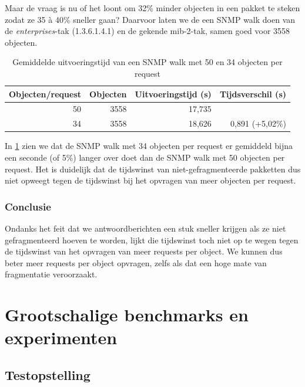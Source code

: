 Maar de vraag is nu of het loont om 32\% minder objecten in een pakket te steken zodat ze 35 à 40\% sneller gaan?
Daarvoor laten we de \nwmretriever{} een SNMP walk doen van de \textit{enterprises}-tak (1.3.6.1.4.1) en de gekende mib-2-tak, samen goed voor 3558 objecten.

\begin{table}[h]
\centering
\begin{tabular}{@{}rrrr@{}}
\toprule
Objecten/request & Objecten & Uitvoeringstijd (s) & Tijdsverschil (s) \\ \midrule
50               & 3558     & 17,735              &                   \\
34               & 3558     & 18,626              & 0,891 (+5,02\%)   \\ \bottomrule
\end{tabular}
\caption{Gemiddelde uitvoeringstijd van een SNMP walk met 50 en 34 objecten per request}
\label{tabel-fragmentatie-uitvoeringstijd}
\end{table}

In \cref{tabel-fragmentatie-uitvoeringstijd} zien we dat de SNMP walk met 34 objecten per request er gemiddeld bijna een seconde (of 5\%) langer over doet
dan de SNMP walk met 50 objecten per request.
Het is duidelijk dat de tijdswinst van niet-gefragmenteerde pakketten dus niet opweegt tegen de tijdswinst bij het opvragen van meer objecten per request.

\subsubsection{Conclusie}

Ondanks het feit dat we antwoordberichten een stuk sneller krijgen als ze niet gefragmenteerd hoeven te worden,
lijkt die tijdswinst toch niet op te wegen tegen de tijdswinst van het opvragen van meer requests per object.
We kunnen dus beter meer requests per object opvragen, zelfs als dat een hoge mate van fragmentatie veroorzaakt.


\section{Grootschalige benchmarks en experimenten}


\subsection{Testopstelling}


